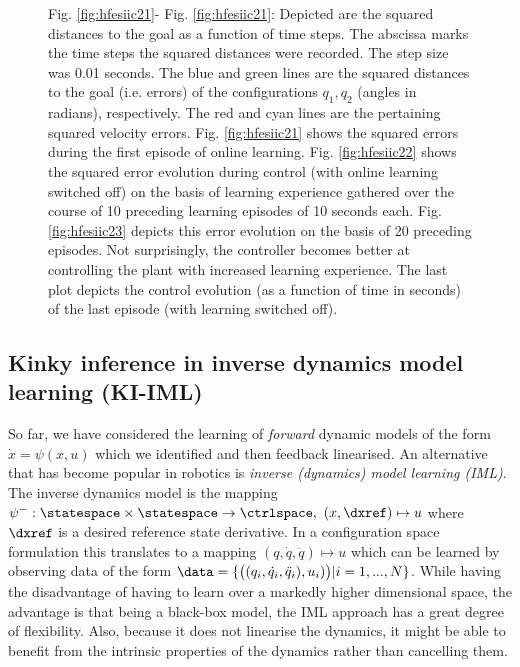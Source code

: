 \begin{figure}
        \centering
%


        \caption{Fig. \ref{fig:hfesiic21}- Fig. \ref{fig:hfesiic21}: Depicted are the squared distances to the goal as a function of time steps. The abscissa marks the time steps the squared distances were recorded. The step size was 0.01 seconds. The blue and green lines are the squared distances to the goal (i.e. errors) of the configurations $q_1,q_2$ (angles in radians), respectively. The red and cyan lines are the pertaining squared velocity errors. Fig. \ref{fig:hfesiic21} shows the squared errors during the first episode of online learning. Fig. \ref{fig:hfesiic22} shows the squared error evolution during control (with online learning switched off) on the basis of learning experience gathered over the course of 10 preceding learning episodes of 10 seconds each. Fig. \ref{fig:hfesiic23} depicts this error evolution on the basis of 20 preceding episodes. Not surprisingly, the controller becomes better at controlling the plant with increased learning experience. The last plot depicts the control evolution (as a function of time in seconds) of the last episode (with learning switched off).
}
\label{fig:hfesiic}
\end{figure}	



\subsection{Kinky inference in inverse dynamics model learning (KI-IML)}
So far, we have considered the learning of \textit{forward} dynamic models of the form $\dot x = \psi(x,u)$ which we identified and then feedback linearised.  An alternative that has become popular in robotics is \textit{inverse (dynamics) model learning (IML)}.
The inverse dynamics model is the mapping $\psi^{-} : \statespace \times \statespace \to \ctrlspace,$
$ (x,\dxref) \mapsto u$ where $\dxref$ is a desired reference state derivative. In a configuration space formulation this translates to a mapping $ (q,\dot q,\ddot q) \mapsto u$ which can be learned by observing data of the form $\data =\{ \bigl((q_i,\dot q_i, \ddot q_i), u_i) \bigr)| i=1,...,N\}$. While having the disadvantage of having to learn over a markedly higher dimensional space, the advantage is that being a black-box model, the IML approach has a great degree of flexibility. Also, because it does not linearise the dynamics, it might be able to benefit from the intrinsic properties of the dynamics rather than cancelling them.


